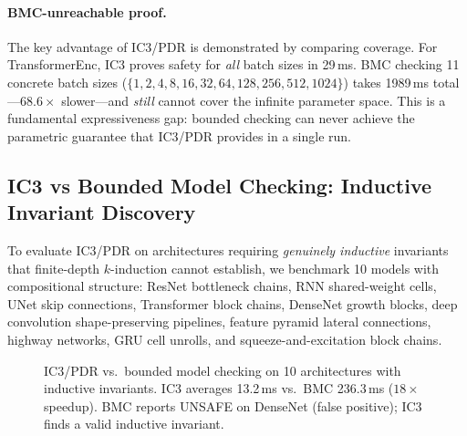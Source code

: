 \documentclass[11pt]{article}
\begin{document}
\paragraph{BMC-unreachable proof.}
The key advantage of IC3/PDR is demonstrated by comparing coverage.
For TransformerEnc, IC3 proves safety for \emph{all} batch sizes
in 29\,ms.  BMC checking 11 concrete batch sizes
($\{1, 2, 4, 8, 16, 32, 64, 128, 256, 512, 1024\}$) takes 1989\,ms
total---$68.6\times$ slower---and \emph{still} cannot cover the
infinite parameter space.  This is a fundamental expressiveness gap:
bounded checking can never achieve the parametric guarantee that
IC3/PDR provides in a single run.

\subsection{IC3 vs Bounded Model Checking: Inductive Invariant Discovery}\label{sec:ic3-vs-bmc}

To evaluate IC3/PDR on architectures requiring \emph{genuinely inductive}
invariants that finite-depth $k$-induction cannot establish, we benchmark
10 models with compositional structure: ResNet bottleneck chains,
RNN shared-weight cells, UNet skip connections, Transformer block chains,
DenseNet growth blocks, deep convolution shape-preserving pipelines,
feature pyramid lateral connections, highway networks, GRU cell unrolls,
and squeeze-and-excitation block chains.

\begin{figure}[t]
\centering
{}
\caption{IC3/PDR vs.\ bounded model checking on 10 architectures with
  inductive invariants.  IC3 averages 13.2\,ms vs.\ BMC 236.3\,ms
  ($18\times$ speedup).  BMC reports UNSAFE on DenseNet (false positive);
  IC3 finds a valid inductive invariant.}
\label{fig:ic3-vs-bmc}
\end{figure}
\end{document}
